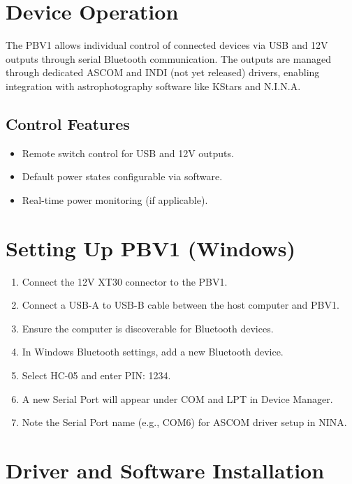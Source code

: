 \documentclass[a4paper,10pt,twocolumn]{article}
\begin{document}
\section*{Device Operation}
The PBV1 allows individual control of connected devices via USB and 12V outputs through serial Bluetooth communication. The outputs are managed through dedicated ASCOM and INDI (not yet released) drivers, enabling integration with astrophotography software like KStars and N.I.N.A.

\subsection*{Control Features}
\begin{itemize}
    \item Remote switch control for USB and 12V outputs.
    \item Default power states configurable via software.
    \item Real-time power monitoring (if applicable).
\end{itemize}

\section*{Setting Up PBV1 (Windows)}
\begin{enumerate}
    \item Connect the 12V XT30 connector to the PBV1.
    \item Connect a USB-A to USB-B cable between the host computer and PBV1.
    \item Ensure the computer is discoverable for Bluetooth devices.
    \item In Windows Bluetooth settings, add a new Bluetooth device.
    \item Select HC-05 and enter PIN: 1234.
    \item A new Serial Port will appear under COM and LPT in Device Manager.
    \item Note the Serial Port name (e.g., COM6) for ASCOM driver setup in NINA.
\end{enumerate}

\section*{Driver and Software Installation}
\end{document}
